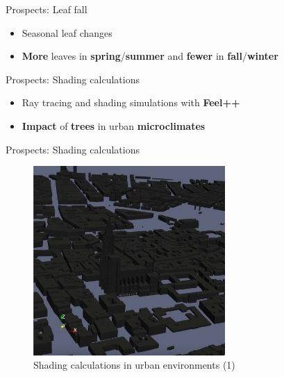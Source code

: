 \documentclass[10pt]{beamer}
\begin{document}
\begin{frame}{Prospects: Leaf fall}
  \Large
  \begin{itemize}
    \item Seasonal leaf changes
    \item \textbf{More} leaves in \textbf{spring}/\textbf{summer} and \textbf{fewer} in \textbf{fall}/\textbf{winter}
  \end{itemize}
\end{frame}

\begin{frame}{Prospects: Shading calculations}
  \Large
  \begin{itemize}
    \item Ray tracing and shading simulations with \textbf{Feel++}
    \item \textbf{Impact} of \textbf{trees} in urban \textbf{microclimates}
  \end{itemize}
\end{frame}

\begin{frame}{Prospects: Shading calculations}
  \begin{figure}
      \centering
      \includegraphics[width=0.65\textwidth]{images/shading-1.png}
      \caption{Shading calculations in urban environments (1)}
  \end{figure}
\end{frame}
\end{document}
